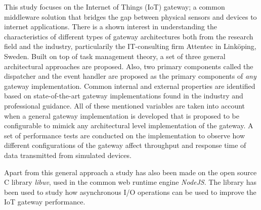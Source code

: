 This study focuses on the Internet of Things (IoT) gateway; a common middleware
solution that bridges the gap between physical sensors and devices to internet
applications. There is a shown interest in understanding the characteristics of
different types of gateway architectures both from the research field and the
industry, particularily the IT-consulting firm Attentec in Linköping, Sweden.
Built on top of task management theory, a set of three general architectural
approaches are proposed. Also, two primary components called the dispatcher and
the event handler are proposed as the primary components of \textit{any}
gateway implementation. Common internal and external properties are identified
based on state-of-the-art gateway implementations found in the industry and
professional guidance. All of these mentioned variables are taken into account
when a general gateway implementation is developed that is proposed to be
configurable to mimick any architectural level implementation of the gateway. A
set of performance tests are conducted on the implementation to observe how
different configurations of the gateway affect throughput and response time of
data transmitted from simulated devices.

Apart from this general approach a study has also been made on the open source
C library \textit{libuv}, used in the common web runtime engine
\textit{NodeJS}. The library has been used to study how asynchronous I/O
operations can be used to improve the IoT gateway performance.
